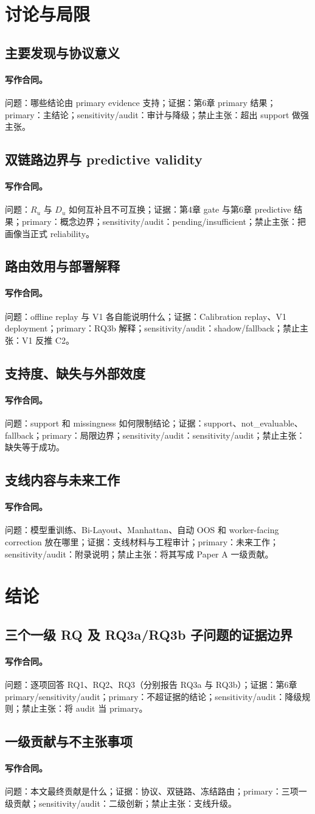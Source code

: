 \documentclass[UTF8,a4paper,12pt]{ctexart}
\newcommand{\contract}[5]{\paragraph{写作合同。}问题：#1；证据：#2；primary：#3；sensitivity/audit：#4；禁止主张：#5。}
\begin{document}
\section{讨论与局限}
\subsection{主要发现与协议意义}
\contract{哪些结论由 primary evidence 支持}{第6章 primary 结果}{主结论}{审计与降级}{超出 support 做强主张}
\subsection{双链路边界与 predictive validity}
\contract{$R_u$ 与 $D_u$ 如何互补且不可互换}{第4章 gate 与第6章 predictive 结果}{概念边界}{pending/insufficient}{把画像当正式 reliability}
\subsection{路由效用与部署解释}
\contract{offline replay 与 V1 各自能说明什么}{Calibration replay、V1 deployment}{RQ3b 解释}{shadow/fallback}{V1 反推 C2}
\subsection{支持度、缺失与外部效度}
\contract{support 和 missingness 如何限制结论}{support、not\_evaluable、fallback}{局限边界}{sensitivity/audit}{缺失等于成功}
\subsection{支线内容与未来工作}
\contract{模型重训练、Bi-Layout、Manhattan、自动 OOS 和 worker-facing correction 放在哪里}{支线材料与工程审计}{未来工作}{附录说明}{将其写成 Paper A 一级贡献}

\section{结论}
\subsection{三个一级 RQ 及 RQ3a/RQ3b 子问题的证据边界}
\contract{逐项回答 RQ1、RQ2、RQ3（分别报告 RQ3a 与 RQ3b）}{第6章 primary/sensitivity/audit}{不超证据的结论}{降级规则}{将 audit 当 primary}
\subsection{一级贡献与不主张事项}
\contract{本文最终贡献是什么}{协议、双链路、冻结路由}{三项一级贡献}{二级创新}{支线升级}
\end{document}
